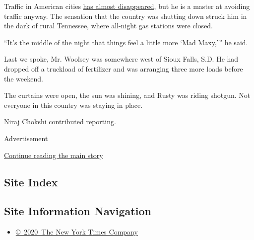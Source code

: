 Traffic in American cities
\href{https://www.nytimes3xbfgragh.onion/interactive/2020/03/22/climate/coronavirus-usa-traffic.html}{has
almost disappeared}, but he is a master at avoiding traffic anyway. The
sensation that the country was shutting down struck him in the dark of
rural Tennessee, where all-night gas stations were closed.

``It's the middle of the night that things feel a little more `Mad
Maxy,''' he said.

Last we spoke, Mr. Woolsey was somewhere west of Sioux Falls, S.D. He
had dropped off a truckload of fertilizer and was arranging three more
loads before the weekend.

The curtains were open, the sun was shining, and Rusty was riding
shotgun. Not everyone in this country was staying in place.

Niraj Chokshi contributed reporting.

Advertisement

\protect\hyperlink{after-bottom}{Continue reading the main story}

\hypertarget{site-index}{%
\subsection{Site Index}\label{site-index}}

\hypertarget{site-information-navigation}{%
\subsection{Site Information
Navigation}\label{site-information-navigation}}

\begin{itemize}
\tightlist
\item
  \href{https://help.nytimes3xbfgragh.onion/hc/en-us/articles/115014792127-Copyright-notice}{©~2020~The
  New York Times Company}
\end{itemize}

